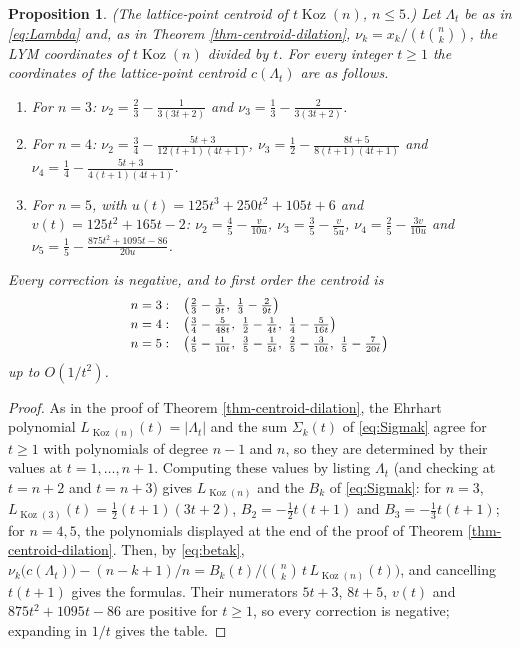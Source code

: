 \documentclass[11pt, a4paper, abstract=yes]{scrartcl}
\theoremstyle{definition}
\theoremstyle{remark}
\theoremstyle{plain}
\newtheorem{proposition}[definition]{Proposition}
\theoremstyle{remark}
\theoremstyle{plain}
\newcommand{\Koz}{\operatorname{Koz}}
\newcommand{\leannone}{\tikz[baseline=-0.6ex]\draw[leannone,line width=0.6pt] (0,0) circle (0.55ex);}
\newcommand{\leanmark}[1]{\leavevmode{\reversemarginpar\marginnote{\raggedleft#1}}}
\begin{document}
\begin{proposition}
\leanmark{\leannone}(\emph{The lattice-point centroid of \(t\Koz(n)\), \(n\le5\).}) Let \(\Lambda_t\) be as in
\eqref{eq:Lambda} and, as in Theorem \ref{thm-centroid-dilation}, \(\nu_k=x_k/(t\binom nk)\), the LYM coordinates of
\(t\Koz(n)\) divided by \(t\). For every integer \(t\ge1\) the coordinates of the lattice-point centroid
\(c(\Lambda_t)\) are as follows.
\begin{enumerate}
\item For \(n=3\): \(\nu_2=\frac23-\frac1{3(3t+2)}\) and \(\nu_3=\frac13-\frac2{3(3t+2)}\).
\item For \(n=4\): \(\nu_2=\frac34-\frac{5t+3}{12(t+1)(4t+1)}\), \(\nu_3=\frac12-\frac{8t+5}{8(t+1)(4t+1)}\) and
\(\nu_4=\frac14-\frac{5t+3}{4(t+1)(4t+1)}\).
\item For \(n=5\), with \(u(t)=125t^3+250t^2+105t+6\) and \(v(t)=125t^2+165t-2\):
\(\nu_2=\frac45-\frac{v}{10u}\), \(\nu_3=\frac35-\frac v{5u}\), \(\nu_4=\frac25-\frac{3v}{10u}\) and
\(\nu_5=\frac15-\frac{875t^2+1095t-86}{20u}\).
\end{enumerate}
Every correction is negative, and to first order the centroid is
\[\small
\begin{array}{ll}
n=3: & \bigl(\tfrac23-\tfrac1{9t},\ \tfrac13-\tfrac2{9t}\bigr)\\[2pt]
n=4: & \bigl(\tfrac34-\tfrac5{48t},\ \tfrac12-\tfrac1{4t},\ \tfrac14-\tfrac5{16t}\bigr)\\[2pt]
n=5: & \bigl(\tfrac45-\tfrac1{10t},\ \tfrac35-\tfrac1{5t},\ \tfrac25-\tfrac3{10t},\ \tfrac15-\tfrac7{20t}\bigr)
\end{array}
\]
up to \(O(1/t^2)\).
\label{prop-dilates}
\end{proposition}

\begin{proof}
As in the proof of Theorem \ref{thm-centroid-dilation}, the Ehrhart polynomial
\(L_{\Koz(n)}(t)=\lvert\Lambda_t\rvert\) and the sum \(\Sigma_k(t)\) of \eqref{eq:Sigmak} agree for
\(t\ge1\) with polynomials of degree \(n-1\) and \(n\), so they are determined by their values at
\(t=1,\dots,n+1\). Computing these values by listing \(\Lambda_t\) (and checking at \(t=n+2\) and
\(t=n+3\)) gives \(L_{\Koz(n)}\) and the \(B_k\) of \eqref{eq:Sigmak}: for \(n=3\),
\(L_{\Koz(3)}(t)=\tfrac12(t+1)(3t+2)\), \(B_2=-\tfrac12t(t+1)\) and \(B_3=-\tfrac13t(t+1)\); for
\(n=4,5\), the polynomials displayed at the end of the proof of Theorem \ref{thm-centroid-dilation}.
Then, by \eqref{eq:betak},
\(\nu_k\bigl(c(\Lambda_t)\bigr)-(n-k+1)/n=B_k(t)/\bigl(\binom nk\,t\,L_{\Koz(n)}(t)\bigr)\), and
cancelling \(t(t+1)\) gives the formulas. Their numerators \(5t+3\), \(8t+5\), \(v(t)\) and
\(875t^2+1095t-86\) are
positive for \(t\ge1\), so every correction is negative; expanding in \(1/t\) gives the table.
\end{proof}
\end{document}
